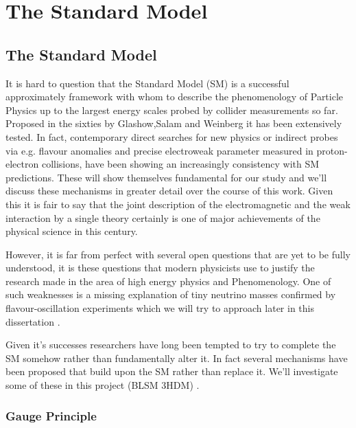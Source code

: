 \chapter{The Standard Model}
\label{ch:SM}

\section{The Standard Model}

It is hard to question that the Standard Model (SM) is a successful approximately framework with whom to describe the phenomenology of Particle Physics up to the largest energy scales probed by collider measurements so far. Proposed in the sixties by Glashow,Salam and Weinberg it has been extensively tested. In fact, contemporary direct searches for new physics or indirect probes via e.g. flavour anomalies and precise electroweak parameter measured in proton-electron collisions, have been showing an increasingly consistency with SM predictions.  { \color{blue} These will show themselves fundamental for our study and we'll discuss these mechanisms in greater detail  over the course of this work. } %
{ \color{red}  Given this it is fair to say that the joint description of the  electromagnetic and the  weak  interaction  by  a  single  theory  certainly  is  one  of  major  achievements  of the physical science in this century. } 

However, it is far from perfect with several open questions that are yet to be fully understood, it is these questions that modern physicists use to justify the research made in the area of high energy physics and Phenomenology. One of such weaknesses is a missing explanation of tiny neutrino masses confirmed by flavour-oscillation experiments { \color{blue} which we will try to approach later in this dissertation }.  

Given it's successes researchers have long been tempted to try to complete the SM somehow rather than fundamentally alter it. In fact several mechanisms have been proposed that build upon the SM rather than replace it. { \color{blue}  We'll investigate some of these in this project (BLSM 3HDM) . } 


\subsection{Gauge Principle}

